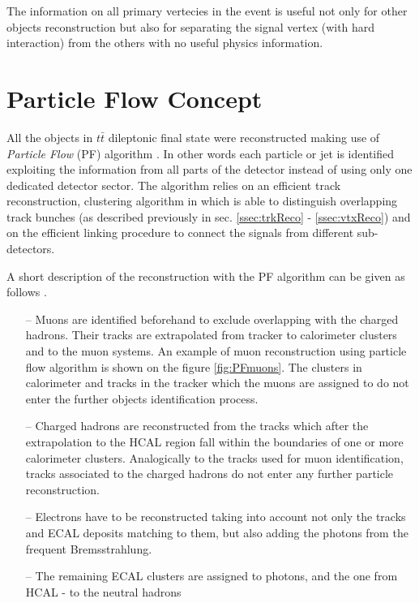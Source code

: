 The information on all primary vertecies in the event is useful not only for other objects reconstruction but also for separating the signal vertex (with hard interaction) 
from the others with no useful physics information.

\section{Particle Flow Concept}\label{sec:PF}

All the objects in $t\bar{t}$ dileptonic final state were reconstructed making use of \textit{Particle Flow} (PF)
algorithm \cite{Beaudette:2014cea}. In other words each particle or jet is identified exploiting the information from all parts
of the detector instead of using only one dedicated detector sector. The algorithm relies on an efficient track reconstruction,
clustering algorithm in which is able to distinguish overlapping track bunches (as described previously in sec. \ref{ssec:trkReco} - \ref{ssec:vtxReco})
and on the efficient linking procedure to connect the signals from different sub-detectors.

A short description of the reconstruction with the PF algorithm can be given as follows \cite{Beaudette:2014cea}.

\begin{itemize}
 \item [--] Muons are identified beforehand to exclude overlapping with the charged hadrons. Their tracks are extrapolated
 from tracker to calorimeter clusters and to the muon systems. An example of muon reconstruction using particle flow algorithm is 
 shown on the figure \ref{fig:PFmuons}. The clusters in calorimeter and tracks in the tracker which the muons are assigned to
 do not enter the further objects identification process.
 \item [--] Charged hadrons are reconstructed from the tracks which after the extrapolation to the HCAL region fall within the boundaries
 of one or more calorimeter clusters. Analogically to the tracks used for muon identification, tracks associated to the charged 
 hadrons do not enter any further particle reconstruction.
 \item [--] Electrons have to be reconstructed taking into account not only the tracks and ECAL deposits matching to them, but also
 adding the photons from the frequent Bremsstrahlung.
 \item [--] The remaining ECAL clusters are assigned to photons, and the one from HCAL - to the neutral hadrons
\end{itemize}

